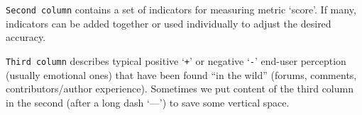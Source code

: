 \documentclass[11pt]{article}
\begin{document}
\noindent\texttt{Second column} contains a set of indicators for measuring metric `score'. If many, indicators can be added together or used individually to adjust the desired accuracy.

\smallskip

\noindent\texttt{Third column} describes typical positive `\texttt{+}' or negative `\texttt{-}' end-user perception (usually emotional ones) that have been found ``in the wild'' (forums, comments, contributors/author experience). Sometimes we put content of the third column in the second (after a long dash `---') to save some vertical space.

\restoregeometry

\newcommand{\cnt}{\stepcounter{ccnt}\the\value{ccnt}.}
\newcommand{\gray}[1]{\textcolor{gray!70}{\scriptsize#1}}
\newcommand{\high}{$\uparrow$}
\newcommand{\low}{$\downarrow$}
\newcommand{\llow}{$^\downarrow$}
\newcommand{\hhigh}{$^\uparrow$}
\newcommand{\mmid}{$^\circ$}
\newcommand{\indicator}{\mbox{$\blacktriangleright$}~}  
\newcommand{\commentp}{\texttt{+}~}
\newcommand{\commentn}{\texttt{-}~}

\newcommand{\metriccategory}[1]{
    \multicolumn{3}{p{\textwidth+30pt}}{\cellcolor{gray!12}\linebreak\centering\textbf{#1}\tiny\linebreak}
}
\newcommand{\ruler}{\noindent {\color{red} \rule{\linewidth}{0.5mm}}}
\setlength{\tabcolsep}{4pt}
\setlength{\arrayrulewidth}{.15ex} %
\setlength\LTleft{-20pt} %
\setlength\LTright{-20pt} %
\footnotesize
\end{document}

